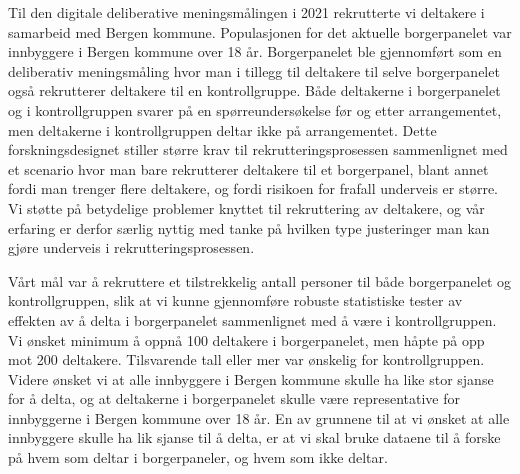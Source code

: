 \documentclass[
  12pt,
  a4paper, 12pt]{article}
\begin{document}
\begin{table}[!h]

\caption{\label{tab:tbl-byborgerpanel}Inviterte og deltakende i Byborgerpanelet 2018}
\centering
{}
\end{table}

Til den digitale deliberative meningsmålingen i 2021 rekrutterte vi deltakere i samarbeid med Bergen kommune. Populasjonen for det aktuelle borgerpanelet var innbyggere i Bergen kommune over 18 år. Borgerpanelet ble gjennomført som en deliberativ meningsmåling hvor man i tillegg til deltakere til selve borgerpanelet også rekrutterer deltakere til en kontrollgruppe. Både deltakerne i borgerpanelet og i kontrollgruppen svarer på en spørreundersøkelse før og etter arrangementet, men deltakerne i kontrollgruppen deltar ikke på arrangementet. Dette forskningsdesignet stiller større krav til rekrutteringsprosessen sammenlignet med et scenario hvor man bare rekrutterer deltakere til et borgerpanel, blant annet fordi man trenger flere deltakere, og fordi risikoen for frafall underveis er større. Vi støtte på betydelige problemer knyttet til rekruttering av deltakere, og vår erfaring er derfor særlig nyttig med tanke på hvilken type justeringer man kan gjøre underveis i rekrutteringsprosessen.

Vårt mål var å rekruttere et tilstrekkelig antall personer til både borgerpanelet og kontrollgruppen, slik at vi kunne gjennomføre robuste statistiske tester av effekten av å delta i borgerpanelet sammenlignet med å være i kontrollgruppen. Vi ønsket minimum å oppnå 100 deltakere i borgerpanelet, men håpte på opp mot 200 deltakere. Tilsvarende tall eller mer var ønskelig for kontrollgruppen. Videre ønsket vi at alle innbyggere i Bergen kommune skulle ha like stor sjanse for å delta, og at deltakerne i borgerpanelet skulle være representative for innbyggerne i Bergen kommune over 18 år. En av grunnene til at vi ønsket at alle innbyggere skulle ha lik sjanse til å delta, er at vi skal bruke dataene til å forske på hvem som deltar i borgerpaneler, og hvem som ikke deltar.
\end{document}
